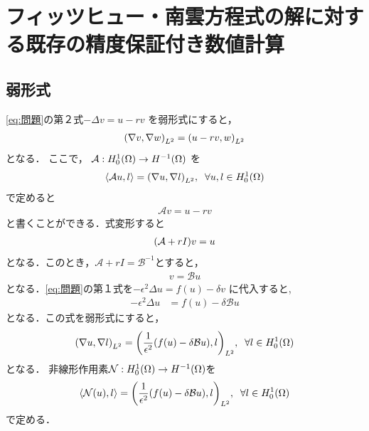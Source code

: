 \chapter{フィッツヒュー・南雲方程式の解に対する既存の精度保証付き数値計算}\label{Existing}


\section{弱形式}
\eqref{eq:問題}の第２式\(-\Delta v =u-rv\)
を弱形式にすると，
\begin{align}
  \qty(\nabla v,\nabla w)_{L^2}
  =
  \qty(u-rv,w)_{L^2}
\end{align}
となる．
ここで，
\(\mathcal{A} : H^1_0\qty(\Omega) \rightarrow H^{-1}\qty(\Omega)\) を
\begin{align}
     \langle\mathcal{A}u,l \rangle
    =
    \qty(\nabla u,\nabla l)_{L^2},\;\;\forall u,l\in H^1_0\qty(\Omega)
\end{align}
で定めると
\begin{align}
  \mathcal{A}v=u-rv
\end{align}
と書くことができる．式変形すると
\begin{align}
  \qty(\mathcal{A}+rI)v=u
\end{align}
となる．このとき，\(\mathcal{A}+rI=\mathcal{B}^{-1}\)とすると，
\begin{align}
  v=\mathcal{B}u
\end{align}
となる．\eqref{eq:問題}の第１式を\(-{\epsilon}^2\Delta u = f(u)-\delta v\)
に代入すると,
\begin{align}
  -{\epsilon}^2\Delta u &= f(u)-\delta \mathcal{B}u
\end{align}
となる．この式を弱形式にすると，
\begin{align}\label{eq:弱形式F}
  \qty(\nabla u,\nabla l)_{L^2}
  =
  \qty(\frac{1}{\epsilon^2}(f(u)-\delta\mathcal{B}u),l)_{L^2},\;\;\forall l\in H^1_0\qty(\Omega)
\end{align}
となる．
非線形作用素\(\mathcal{N}:H^1_0\qty(\Omega)\rightarrow H^{-1}\qty(\Omega)\)を
\begin{align}
    \langle \mathcal{N}\qty(u),l \rangle
    =
    \qty(\frac{1}{\epsilon^2}\qty(f(u)-\delta \mathcal{B}u),l)_{L^2},\;\;\forall l\in H^1_0\qty(\Omega)
\end{align}
で定める．

